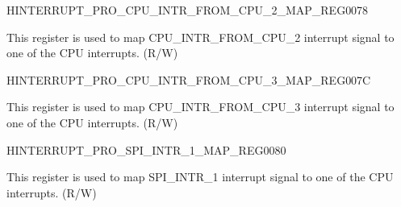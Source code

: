 \begin{register}{H}{INTERRUPT\_PRO\_CPU\_INTR\_FROM\_CPU\_2\_MAP\_REG}{\hexprefix{}0078}\label{regdesc:INTERRUPTPROCPUINTRFROMCPU2MAPREG}
%
%
\regnewline%
\begin{regdesc}\begin{reglist}
\label{fielddesc:INTERRUPTPROCPUINTRFROMCPU2MAP}\item [INTERRUPT\_PRO\_CPU\_INTR\_FROM\_CPU\_2\_MAP] This register is used to map CPU\_INTR\_FROM\_CPU\_2 interrupt signal to one of the CPU interrupts. (R/W)
\end{reglist}\end{regdesc}
\end{register}


\begin{register}{H}{INTERRUPT\_PRO\_CPU\_INTR\_FROM\_CPU\_3\_MAP\_REG}{\hexprefix{}007C}\label{regdesc:INTERRUPTPROCPUINTRFROMCPU3MAPREG}
%
%
\regnewline%
\begin{regdesc}\begin{reglist}
\label{fielddesc:INTERRUPTPROCPUINTRFROMCPU3MAP}\item [INTERRUPT\_PRO\_CPU\_INTR\_FROM\_CPU\_3\_MAP] This register is used to map CPU\_INTR\_FROM\_CPU\_3 interrupt signal to one of the CPU interrupts. (R/W)
\end{reglist}\end{regdesc}
\end{register}


\begin{register}{H}{INTERRUPT\_PRO\_SPI\_INTR\_1\_MAP\_REG}{\hexprefix{}0080}\label{regdesc:INTERRUPTPROSPIINTR1MAPREG}
%
%
\regnewline%
\begin{regdesc}\begin{reglist}
\label{fielddesc:INTERRUPTPROSPIINTR1MAP}\item [INTERRUPT\_PRO\_SPI\_INTR\_1\_MAP] This register is used to map SPI\_INTR\_1 interrupt signal to one of the CPU interrupts. (R/W)
\end{reglist}\end{regdesc}
\end{register}



